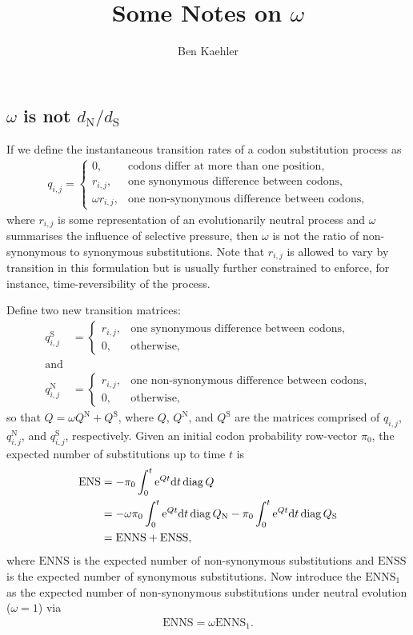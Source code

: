 \documentclass[a4paper,oneside,12pt]{article}
\begin{document}
\title{Some Notes on $\omega$}
\author{Ben Kaehler}
\maketitle
\subsection*{$\omega$ is not $d_\text{N}/d_\text{S}$}
If we define the instantaneous transition rates of a codon substitution
process as
\begin{align*}
q_{i,j} = \begin{cases} 0, &\text{codons differ at more than one position},\\
r_{i,j}, &\text{one synonymous difference between codons},\\
\omega r_{i,j}, &\text{one non-synonymous difference between codons},\end{cases}
\end{align*}
where $r_{i,j}$ is some representation of an evolutionarily neutral
process and $\omega$ summarises the influence of selective pressure,
then $\omega$ is not the ratio of non-synonymous to synonymous
substitutions. Note that $r_{i,j}$ is allowed to vary by transition in
this formulation but is usually further constrained to enforce, for
instance, time-reversibility of the process.

Define two new transition matrices:
\begin{align*}
q_{i,j}^\text{S} &= \begin{cases}
r_{i,j}, &\text{one synonymous difference between codons},\\
0, &\text{otherwise},\end{cases} \\
\text{and} \\
q_{i,j}^\text{N} &= \begin{cases}
r_{i,j}, &\text{one non-synonymous difference between codons},\\
0, &\text{otherwise},\end{cases}
\end{align*}
so that $Q = \omega Q^\text{N} + Q^\text{S}$, where $Q$, $Q^\text{N}$, and $Q^\text{S}$ are the matrices comprised of $q_{i,j}$, $q_{i,j}^\text{N}$, and $q_{i,j}^\text{S}$, respectively. Given an initial codon probability row-vector $\pi_0$, the expected number of substitutions up to time $t$ is
\begin{align*}
\mathrm{ENS} &= -\pi_0\int_0^t \mathrm{e}^{Qt} \mathrm{d} t\operatorname{diag} Q \\
&= -\omega\pi_0\int_0^t \mathrm{e}^{Qt} \mathrm{d} t\operatorname{diag} Q_\text{N} -\pi_0\int_0^t \mathrm{e}^{Qt} \mathrm{d} t\operatorname{diag} Q_\text{S} \\
&=\mathrm{ENNS} + \mathrm{ENSS},
\end{align*}
where $\mathrm{ENNS}$ is the expected number of non-synonymous substitutions and $\mathrm{ENSS}$ is the expected number of synonymous substitutions. Now introduce the $\mathrm{ENNS}_1$ as the expected number of non-synonymous substitutions under neutral evolution ($\omega=1$) via
\begin{align*}
\mathrm{ENNS} = \omega\mathrm{ENNS}_1.
\end{align*}
\end{document}
